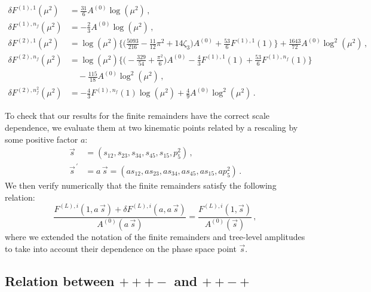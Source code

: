 \documentclass[main.tex]{subfiles}
\begin{document}
\begin{align}
\delta F^{(1),1}(\mu^2)   & =  \frac{31}{6} A^{(0)} \log(\mu^2) \,, \\
\delta F^{(1),n_f}(\mu^2) & =  - \frac{2}{3} A^{(0)} \log(\mu^2) \,, \\
\delta F^{(2),1}(\mu^2) & = \log(\mu^2) \bigg\lbrace \bigg(\frac{5093}{216} - \frac{11}{12}\pi^2 + 14 \zeta_3\bigg) A^{(0)} 
                              + \frac{53}{6}F^{(1),1}(1) \bigg\rbrace  + \frac{1643}{72} A^{(0)} \log^2(\mu^2)  \,, \\
\delta F^{(2),n_f}(\mu^2) & = \log(\mu^2) \bigg\lbrace \bigg(-\frac{329}{54} + \frac{\pi^2}{6} \bigg) A^{(0)} 
                               - \frac{4}{3}F^{(1),1}(1)  + \frac{53}{6}F^{(1),n_f}(1) \bigg\rbrace \nonumber  \\
                            & \quad - \frac{115}{18} A^{(0)} \log^2(\mu^2) \,, \\
\delta F^{(2),n_f^2}(\mu^2) & = - \frac{4}{3} F^{(1),n_f}(1) \log(\mu^2) + \frac{4}{9} A^{(0)} \log^2(\mu^2) \, . 
\end{align}
\endgroup

To check that our results for the finite remainders have the correct scale dependence, we evaluate them at two kinematic points related by a rescaling by some positive factor $a$:
\begin{equation}
\begin{aligned}
\vec{s} &= (s_{12},s_{23},s_{34},s_{45},s_{15},p_5^2) \,,  \\ 
\vec{s}^{\,'} &= a \, \vec{s} = (a s_{12},a s_{23},a s_{34},a s_{45},a s_{15},a p_5^2) \,. 
\end{aligned}
\end{equation}
We then verify numerically that the finite remainders satisfy the following relation:
\begin{equation} \label{eq:Hbbscalingrel}
  \frac{F^{(L),i}(1,a \, \vec{s})+\delta F^{(L),i}(a,a \, \vec{s})}{A^{(0)}(a\,\vec{s})} 
= \frac{F^{(L),i}(1,\vec{s})}{A^{(0)}(\vec{s})} \,,
\end{equation}
where we extended the notation of the finite remainders and tree-level amplitudes to take into account their dependence on the phase space point $\vec{s}$.


\subsection{Relation between $+++-$ and $++-+$} 
\end{document}
